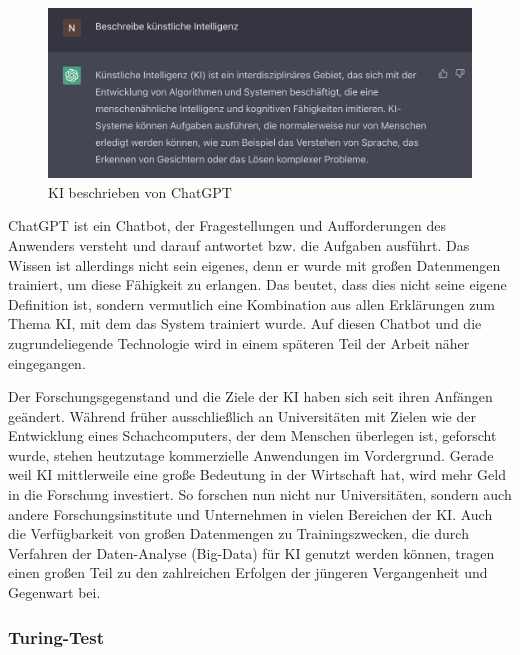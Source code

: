 \documentclass[a4paper,12pt, german]{report}
\begin{document}
\begin{figure}
  \center
 \includegraphics[width=14cm]{images/ChatGPT.png}
  \caption[KI beschrieben von ChatGPT]{KI beschrieben von ChatGPT \cite{04}}
\end{figure}
ChatGPT ist ein Chatbot, der Fragestellungen und Aufforderungen des Anwenders versteht und darauf antwortet bzw. die Aufgaben ausführt. Das Wissen ist allerdings nicht sein eigenes, denn er wurde mit großen Datenmengen trainiert, um diese Fähigkeit zu erlangen. Das beutet, dass dies nicht seine eigene Definition ist, sondern vermutlich eine Kombination aus allen Erklärungen zum Thema KI, mit dem das System trainiert wurde. Auf diesen Chatbot und die zugrundeliegende Technologie wird in einem späteren Teil der Arbeit näher eingegangen.

Der Forschungsgegenstand und die Ziele der KI haben sich seit ihren Anfängen geändert. Während früher ausschließlich an Universitäten mit Zielen wie der Entwicklung eines Schachcomputers, der dem Menschen überlegen ist, geforscht wurde, stehen heutzutage kommerzielle Anwendungen im Vordergrund. 
Gerade weil KI mittlerweile eine große Bedeutung in der Wirtschaft hat, wird mehr Geld in die Forschung investiert. So forschen nun nicht nur Universitäten, sondern auch andere Forschungsinstitute und Unternehmen in vielen Bereichen der KI. Auch die Verfügbarkeit von großen Datenmengen zu Trainingszwecken, die durch Verfahren der Daten-Analyse (Big-Data) für KI genutzt werden können, tragen einen großen Teil zu den zahlreichen Erfolgen der jüngeren Vergangenheit und Gegenwart bei. \cite{10}

\subsubsection{Turing-Test}
\end{document}

